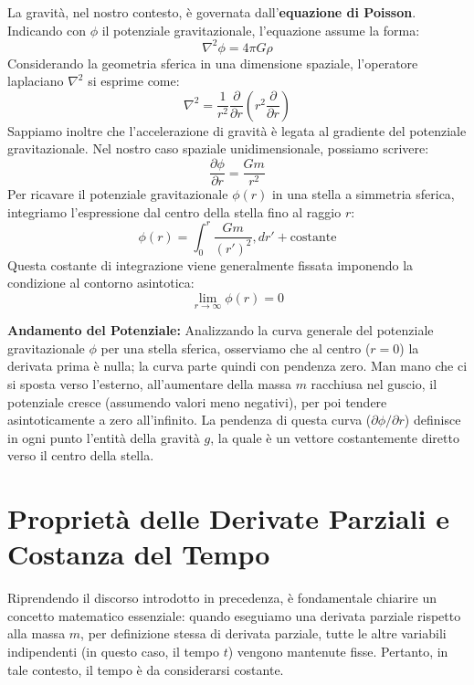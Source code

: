 La gravità, nel nostro contesto, è governata dall'\textbf{equazione di Poisson}. Indicando con $\phi$ il potenziale gravitazionale, l'equazione assume la forma:
\begin{equation}
\nabla^2 \phi = 4\pi G \rho
\end{equation}
Considerando la geometria sferica in una dimensione spaziale, l'operatore laplaciano $\nabla^2$ si esprime come:
\begin{equation}
\nabla^2 = \frac{1}{r^2} \frac{\partial}{\partial r} \left( r^2 \frac{\partial}{\partial r} \right)
\end{equation}
Sappiamo inoltre che l'accelerazione di gravità è legata al gradiente del potenziale gravitazionale. Nel nostro caso spaziale unidimensionale, possiamo scrivere:
\begin{equation}
\frac{\partial \phi}{\partial r} = \frac{G m}{r^2}
\end{equation}
Per ricavare il potenziale gravitazionale $\phi(r)$ in una stella a simmetria sferica, integriamo l'espressione dal centro della stella fino al raggio $r$:
\begin{equation}
\phi(r) = \int_0^r \frac{G m}{(r')^2} , dr' + \text{costante}
\end{equation}
Questa costante di integrazione viene generalmente fissata imponendo la condizione al contorno asintotica:
\begin{equation}
\lim_{r \to \infty} \phi(r) = 0
\end{equation}

\textbf{Andamento del Potenziale:} Analizzando la curva generale del potenziale gravitazionale $\phi$ per una stella sferica, osserviamo che al centro ($r=0$) la derivata prima è nulla; la curva parte quindi con pendenza zero. Man mano che ci si sposta verso l'esterno, all'aumentare della massa $m$ racchiusa nel guscio, il potenziale cresce (assumendo valori meno negativi), per poi tendere asintoticamente a zero all'infinito. La pendenza di questa curva ($\partial \phi / \partial r$) definisce in ogni punto l'entità della gravità $g$, la quale è un vettore costantemente diretto verso il centro della stella.


\section{Proprietà delle Derivate Parziali e Costanza del Tempo}

Riprendendo il discorso introdotto in precedenza, è fondamentale chiarire un concetto matematico essenziale: quando eseguiamo una derivata parziale rispetto alla massa $m$, per definizione stessa di derivata parziale, tutte le altre variabili indipendenti (in questo caso, il tempo $t$) vengono mantenute fisse. Pertanto, in tale contesto, il tempo è da considerarsi costante.

